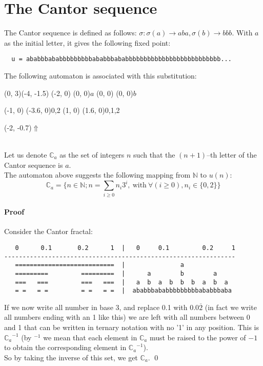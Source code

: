 \documentclass{article}
\begin{document}
\section*{The Cantor sequence}
The Cantor sequence is defined as follows: $\sigma: \sigma(a) \rightarrow aba,
\sigma(b) \rightarrow bbb$. With $a$ as the initial letter, it gives the
following fixed point:
\begin{verbatim}
  u = ababbbababbbbbbbbbababbbababbbbbbbbbbbbbbbbbbbbbbbbbb...
\end{verbatim}
The following automaton is associated with this
substitution:\\
\begin{graph}(0, 3)(-4, -1.5)
  (-2, 0) (0, 0){$a$}
  (0, 0)  (0, 0){$b$}

  (-1, 0) \freetext(-3.6, 0){0,2}
   
  (1, 0) \freetext(1.6, 0){0,1,2}

  \freetext(-2, -0.7){$\Uparrow$}
\end{graph}\\
Let us denote $\mathbb{C}_a$ as the set of integers $n$ such that the
$(n + 1)$--th letter of the Cantor sequence is $a$.\\
The automaton above suggests the following mapping from
$\mathbb{N}$ to $u(n)$:
\begin{displaymath}
  \mathbb{C}_a = \Big\{n \in \mathbb{N}; n = \sum_{i \ge 0} n_i3^i,
  \mathrm{\ with\ } \forall(i \ge 0), n_i \in \{0, 2\}\Big\}
\end{displaymath}

\paragraph{Proof} Consider the Cantor fractal:
\begin{verbatim}
   0      0.1       0.2      1  |   0     0.1         0.2     1
---------------------------------------------------------------
   ===========================  |               a
   =========         =========  |      a        b        a
   ===   ===         ===   ===  |   a  b  a  b  b  b  a  b  a
   = =   = =         = =   = =  |  ababbbababbbbbbbbbababbbaba
\end{verbatim}
If we now write all number in base 3, and replace 0.1 with 0.0$\overline2$
(in fact we write all numbers ending with an 1 like this) we are left with
all numbers between 0 and 1 that can be written in ternary notation with no
'1' in any position. This is ${\mathbb{C}_a}^{-1}$ (by $^{-1}$ we mean that
each element in $\mathbb{C}_a$ must be raised to the power of $-1$ to obtain
the corresponding element in ${\mathbb{C}_a}^{-1}$).\\
So by taking the inverse of this set, we get $\mathbb{C}_a$. \qed
\end{document}
